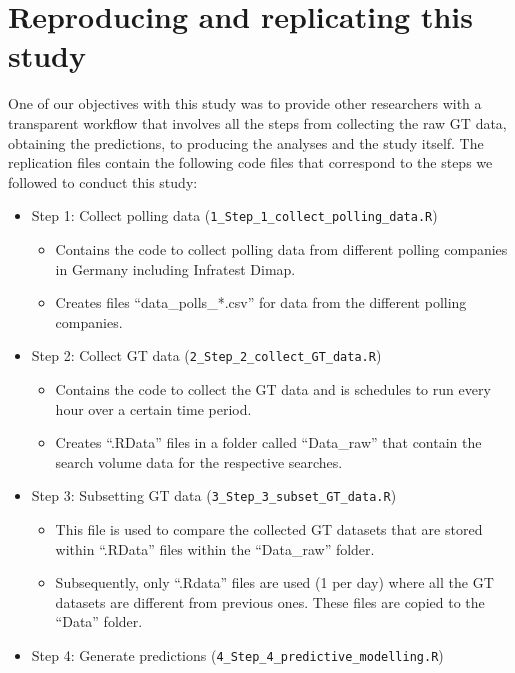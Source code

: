 \documentclass[
  letterpaper,
  DIV=11,
  numbers=noendperiod]{scrartcl}
\providecommand{\tightlist}{%
  \setlength{\itemsep}{0pt}\setlength{\parskip}{0pt}}\usepackage{longtable,booktabs,array}
\begin{document}
\hypertarget{reproducing-and-replicating-this-study}{%
\section{Reproducing and replicating this
study}\label{reproducing-and-replicating-this-study}}

One of our objectives with this study was to provide other researchers
with a transparent workflow that involves all the steps from collecting
the raw GT data, obtaining the predictions, to producing the analyses
and the study itself. The replication files contain the following code
files that correspond to the steps we followed to conduct this study:

\begin{itemize}
\tightlist
\item
  Step 1: Collect polling data
  (\texttt{1\_Step\_1\_collect\_polling\_data.R})

  \begin{itemize}
  \tightlist
  \item
    Contains the code to collect polling data from different polling
    companies in Germany including Infratest Dimap.
  \item
    Creates files ``data\_polls\_*.csv'' for data from the different
    polling companies.
  \end{itemize}
\item
  Step 2: Collect GT data (\texttt{2\_Step\_2\_collect\_GT\_data.R})

  \begin{itemize}
  \tightlist
  \item
    Contains the code to collect the GT data and is schedules to run
    every hour over a certain time period.
  \item
    Creates ``.RData'' files in a folder called ``Data\_raw'' that
    contain the search volume data for the respective searches.
  \end{itemize}
\item
  Step 3: Subsetting GT data (\texttt{3\_Step\_3\_subset\_GT\_data.R})

  \begin{itemize}
  \tightlist
  \item
    This file is used to compare the collected GT datasets that are
    stored within ``.RData'' files within the ``Data\_raw'' folder.
  \item
    Subsequently, only ``.Rdata'' files are used (1 per day) where all
    the GT datasets are different from previous ones. These files are
    copied to the ``Data'' folder.
  \end{itemize}
\item
  Step 4: Generate predictions
  (\texttt{4\_Step\_4\_predictive\_modelling.R})


\end{itemize}
\end{document}
